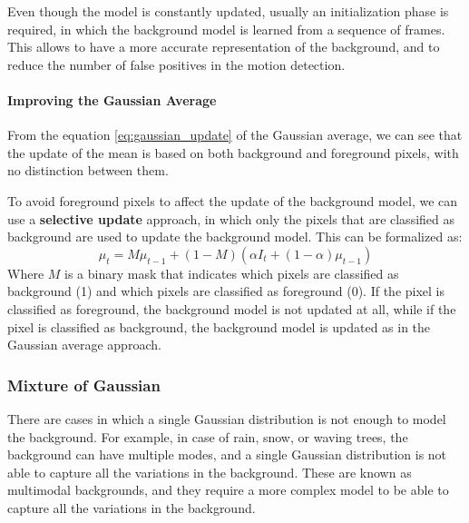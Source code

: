 Even though the model is constantly updated, usually an initialization phase is required, in which the background model is learned from a sequence of frames. This allows to have a more accurate
representation of the background, and to reduce the number of false positives in the motion detection.

\paragraph{Improving the Gaussian Average}
From the equation \ref{eq:gaussian_update} of the Gaussian average, we can see that the update of the mean is based on both
background and foreground pixels, with no distinction between them.

To avoid foreground pixels to affect the update of the background model, we can use a \textbf{selective update} approach,
in which only the pixels that are classified as background are used to update the background model. This can be formalized as:
\begin{equation}
    \mu_t = M\mu_{t-1} + (1 - M)(\alpha I_t + (1 - \alpha) \mu_{t-1})
\end{equation}
Where $M$ is a binary mask that indicates which pixels are classified as background (1) and which pixels are classified as foreground (0).
If the pixel is classified as foreground, the background model is not updated at all, while if the pixel is classified as background, 
the background model is updated as in the Gaussian average approach.

\subsubsection{Mixture of Gaussian}
There are cases in which a single Gaussian distribution is not enough to model the background. For example,
in case of rain, snow, or waving trees, the background can have multiple modes, and a single Gaussian distribution is not able to capture all the variations in the background.
These are known as multimodal backgrounds, and they require a more complex model to be able to capture all the variations in the background.

